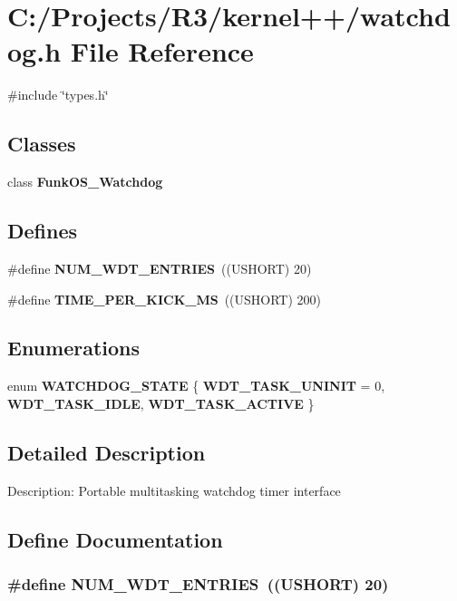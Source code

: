 \section{C:/Projects/R3/kernel++/watchdog.h File Reference}
\label{watchdog_8h}
{\ttfamily \#include \char`\"{}types.h\char`\"{}}\par
\subsection*{Classes}
\begin{DoxyCompactItemize}
\item 
class {\bf FunkOS\_\-Watchdog}
\end{DoxyCompactItemize}
\subsection*{Defines}
\begin{DoxyCompactItemize}
\item 
\#define {\bf NUM\_\-WDT\_\-ENTRIES}~((USHORT) 20)
\item 
\#define {\bf TIME\_\-PER\_\-KICK\_\-MS}~((USHORT) 200)
\end{DoxyCompactItemize}
\subsection*{Enumerations}
\begin{DoxyCompactItemize}
\item 
enum {\bf WATCHDOG\_\-STATE} \{ {\bf WDT\_\-TASK\_\-UNINIT} =  0, 
{\bf WDT\_\-TASK\_\-IDLE}, 
{\bf WDT\_\-TASK\_\-ACTIVE}
 \}
\end{DoxyCompactItemize}


\subsection{Detailed Description}
Description: Portable multitasking watchdog timer interface 

\subsection{Define Documentation}
\subsubsection[{NUM\_\-WDT\_\-ENTRIES}]{\setlength{\rightskip}{0pt plus 5cm}\#define NUM\_\-WDT\_\-ENTRIES~((USHORT) 20)}\label{watchdog_8h_a5ea87a66b60b75a10f8710b0cd1759c5}
